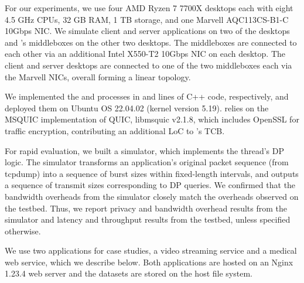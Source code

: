 For our experiments, we use four AMD Ryzen 7 7700X desktops each with eight 4.5
GHz CPUs, 32 GB RAM, 1 TB storage, and one Marvell AQC113CS-B1-C 10Gbps NIC. We
simulate client and server applications on two of the desktops and {\sys}'s
middleboxes on the other two desktops.
The middleboxes are connected to each other via an additional Intel X550-T2
10Gbps NIC on each desktop.
The client and server desktops are connected to one of the two
middleboxes each via the Marvell NICs, overall forming a linear topology.

We implemented the {\ushaper} and {\dshaper} processes in
 and  lines of C++ code, respectively, and deployed
them on Ubuntu OS 22.04.02 (kernel version 5.19).
{\sys} relies on the MSQUIC implementation of QUIC, libmsquic v2.1.8, which
includes OpenSSL for traffic encryption, contributing an additional
 LoC to {\sys}'s TCB.

For rapid evaluation, we  built a simulator,
which implements the {\prepare} thread's DP logic.
The simulator transforms  an application's original packet sequence (from
tcpdump) into a sequence of burst sizes within fixed-length
intervals, and outputs a sequence of transmit sizes corresponding to DP
queries.
%
{We confirmed that the bandwidth overheads from the simulator closely match
the overheads observed on the testbed. Thus, we report privacy and
bandwidth overhead results from the simulator and latency and
throughput results from the testbed, unless specified otherwise.}
%

We use two applications for case studies, a video streaming service and a
medical web service, which we describe below. Both applications are hosted on an
Nginx 1.23.4 web server and the datasets are stored on the host file system.


